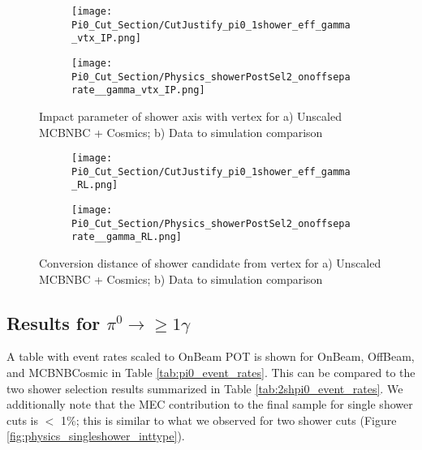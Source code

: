 \documentclass{article}
\begin{document}
\begin{figure}[t!]
\centering
  \begin{subfigure}[t]{0.35\textwidth}
    \centering
\texttt{[image: Pi0\_Cut\_Section/CutJustify\_pi0\_1shower\_eff\_gamma\_vtx\_IP.png]}
  \caption{ }
  \end{subfigure} 
  \hspace{30mm}
  \begin{subfigure}[t]{0.35\textwidth}
    \centering
\texttt{[image: Pi0\_Cut\_Section/Physics\_showerPostSel2\_onoffseparate\_\_gamma\_vtx\_IP.png]}
  \caption{ }
  \end{subfigure} 
\caption{ Impact parameter of shower axis with vertex for a) Unscaled MCBNBC + Cosmics; b) Data to simulation comparison }
\label{fig:cutjust_pi0_1shower_IP}
\end{figure}

\begin{figure}[h!]
\centering
  \begin{subfigure}[t]{0.35\textwidth}
    \centering
\texttt{[image: Pi0\_Cut\_Section/CutJustify\_pi0\_1shower\_eff\_gamma\_RL.png]}
  \caption{ }
  \end{subfigure} 
  \hspace{30mm}
  \begin{subfigure}[t]{0.35\textwidth}
    \centering
\texttt{[image: Pi0\_Cut\_Section/Physics\_showerPostSel2\_onoffseparate\_\_gamma\_RL.png]}
  \caption{ }
  \end{subfigure} 
\caption{ Conversion distance of shower candidate from vertex for a) Unscaled MCBNBC + Cosmics; b) Data to simulation comparison }
\label{fig:cutjust_pi0_1shower_RL}
\end{figure}


\subsection{Results for $\pi^0\rightarrow \geq 1\gamma$}
\par A table with event rates scaled to OnBeam POT is shown for OnBeam, OffBeam, and MCBNBCosmic in Table \ref{tab:pi0_event_rates}. This can be compared to the two shower selection results summarized in Table \ref{tab:2shpi0_event_rates}.  We additionally note that the MEC contribution to the final sample for single shower cuts is $<$ 1\%; this is similar to what we observed for two shower cuts (Figure \ref{fig:physics_singleshower_inttype}). %
\end{document}
